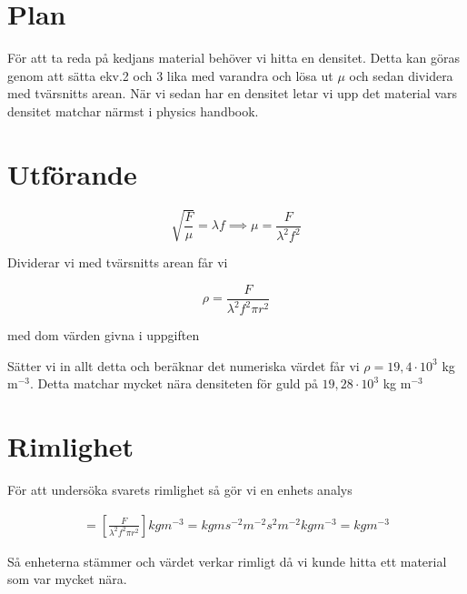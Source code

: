 \documentclass[a4paper]{article}
\begin{document}
\section{Plan}
För att ta reda på kedjans material behöver vi hitta en densitet. Detta kan göras genom att sätta ekv.2 och 3 lika med varandra och lösa ut $\mu$ och sedan dividera med tvärsnitts arean. När vi sedan har en densitet letar vi upp det material vars densitet matchar närmst i physics handbook. 
\section{Utförande}

\begin{equation}
    \sqrt{\frac{F}{\mu}} = \lambda f \implies \mu = \frac{F}{\lambda^2 f^2}
\end{equation}

Dividerar vi med tvärsnitts arean får vi

\begin{equation}
    \rho = \frac{F}{\lambda^2 f^2 \pi r^2}
\end{equation}

med dom värden givna i uppgiften

Sätter vi in allt detta och beräknar det numeriska värdet får vi $\rho = 19,4 \cdot 10^3$ kg m$^{-3}$. Detta matchar mycket nära densiteten för guld på $19,28 \cdot 10^3$ kg m$^{-3}$

\section{Rimlighet}

För att undersöka svarets rimlighet så gör vi en enhets analys

\begin{align}
    [\rho] = [\frac{F}{\lambda^2 f^2 \pi r^2}]
    kg m^{-3} = kg m s^{-2} m^{-2} s^2 m^{-2}
    kg m^{-3} = kg m^{-3}
\end{align}

Så enheterna stämmer och värdet verkar rimligt då vi kunde hitta ett material som var mycket nära.
\end{document}
